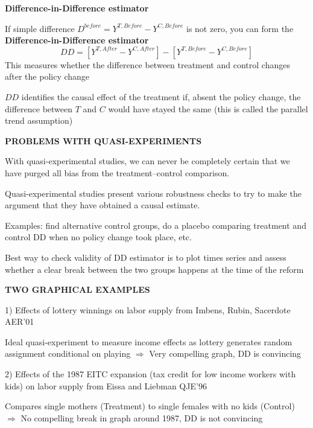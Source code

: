\documentclass[landscape]{slides}
\begin{document}
\begin{slide}
\begin{center}
{\bf Difference-in-Difference estimator}
\end{center}
If simple difference $D^{before} = Y^{T, Before} - Y^{C, Before} $ is not zero, you can
form the  {\bf Difference-in-Difference estimator}
\[DD = [Y^{T, After} - Y^{C, After} ] -  [Y^{T, Before} - Y^{C, Before} ] \]
This measures whether the difference between treatment and control changes after the policy change

$DD$ identifies the causal effect of the treatment if, absent the policy change, the difference between $T$ and $C$
would have stayed the same (this is called the parallel trend assumption)

\end{slide}

\begin{slide}

\end{slide}

\begin{slide}
\begin{center}
{\bf PROBLEMS WITH QUASI-EXPERIMENTS}
\end{center}

With quasi-experimental studies, we can never be completely certain that we have purged all bias from the treatment--control comparison.

Quasi-experimental studies present various robustness checks to try to make the argument that they have obtained a causal estimate.

Examples: find alternative control groups, do a placebo comparing treatment and control DD when no policy change
took place, etc.

Best way to check validity of DD estimator is to plot times series and assess whether a clear break between the two
groups happens at the time of the reform

\end{slide}


\begin{slide}
\begin{center}
{\bf TWO GRAPHICAL EXAMPLES}
\end{center}

1) Effects of lottery winnings on labor supply from Imbens, Rubin, Sacerdote AER'01

Ideal quasi-experiment to measure income effects as
lottery generates random assignment conditional on playing $\Rightarrow$ Very compelling
graph, DD is convincing

2) Effects of the 1987 EITC expansion (tax credit for low income workers with kids) on labor supply
from Eissa and Liebman QJE'96

Compares single mothers (Treatment) to single females with no kids (Control) $\Rightarrow$ No
compelling break in graph around 1987, DD is not convincing


\end{slide}
\end{document}

